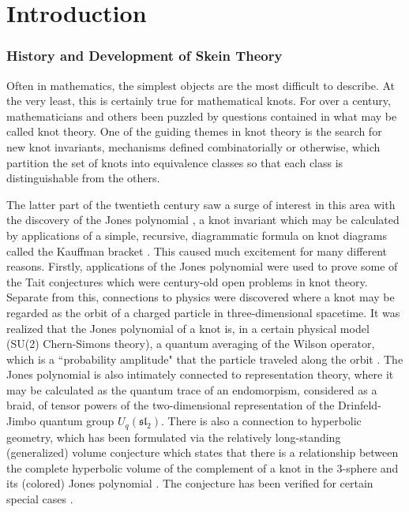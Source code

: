 \chapter{Introduction}

\subsection{History and Development of Skein Theory}

Often in mathematics, the simplest objects are the most difficult to describe. At the very least, this is certainly true for mathematical knots. For over a century, mathematicians and others been puzzled by questions contained in what may be called knot theory. One of the guiding themes in knot theory is the search for new knot invariants, mechanisms defined combinatorially or otherwise, which partition the set of knots into equivalence classes so that each class is distinguishable from the others. 

The latter part of the twentieth century saw a surge of interest in this area with the discovery of the Jones polynomial \cite{Jon85}, a knot invariant which may be calculated by applications of a simple, recursive, diagrammatic formula on knot diagrams called the Kauffman bracket \cite{Kau87}. This caused much excitement for many different reasons. Firstly, applications of the Jones polynomial were used to prove some of the Tait conjectures \cite{Kau87, Thi88} which were century-old open problems in knot theory. Separate from this, connections to physics were discovered where a knot may be regarded as the orbit of a charged particle in three-dimensional spacetime. It was realized that the Jones polynomial of a knot is, in a certain physical model (SU(2) Chern-Simons theory), a quantum averaging of the Wilson operator, which is a ``probability amplitude" that the particle traveled along the orbit \cite{Wit89}. The Jones polynomial is also intimately connected to representation theory, where it may be calculated as the quantum trace of an endomorpism, considered as a braid, of tensor powers of the two-dimensional representation of the Drinfeld-Jimbo quantum group $U_q(\mathfrak{sl}_2)$. There is also a connection to hyperbolic geometry, which has been formulated via the relatively long-standing (generalized) volume conjecture which states that there is a relationship between the complete hyperbolic volume of the complement of a knot in the $3$-sphere and its (colored) Jones polynomial \cite{Hik07}. The conjecture has been verified for certain special cases \cite{KT00}. 

